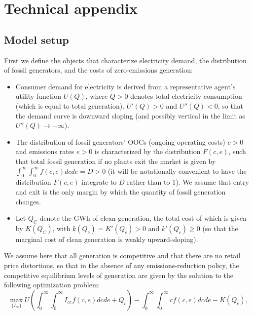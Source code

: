 \documentclass[12pt]{article}
\begin{document}
\newpage

%
%
%
%





\singlespace
\newpage


\appendix
\setcounter{page}{1}
\renewcommand{\thepage}{A-\arabic{page}}

\section*{Technical appendix}

\subsection*{Model setup}
First we define the objects that characterize electricity demand, the distribution of fossil generators, and the costs of zero-emissions generation:
\begin{itemize}
\item Consumer demand for electricity is derived from a representative agent's utility function $U(Q)$, where $Q>0$ denotes total electricity consumption (which is equal to total generation). $U'(Q)>0$ and $U''(Q)<0$, so that the demand curve is downward sloping (and possibly vertical in the limit as $U''(Q)\to -\infty$).
\item The distribution of fossil generators' OOCs (ongoing operating costs) $c>0$ and emissions rates $e>0$ is characterized by the distribution $F(c,e)$, such that total fossil generation if no plants exit the market is given by $\int_0^\infty\int_0^\infty f(c,e)dcde = D>0$ (it will be notationally convenient to have the distribution $F(c,e)$ integrate to $D$ rather than to 1). We assume that entry and exit is the only margin by which the quantity of fossil generation changes.
\item Let $Q_C$ denote the GWh of clean generation, the total cost of which is given by $K(Q_C)$, with $k(Q_c)=K'(Q_c)>0$ and $k'(Q_c)\geq0$ (so that the marginal cost of clean generation is weakly upward-sloping).
\end{itemize}

We assume here that all generation is competitive and that there are no retail price distortions, so that in the absence of any emissions-reduction policy, the competitive equilibrium levels of generation are given by the solution to the following optimization problem:
\begin{equation}
    \max_{\{I_{ce}\}} U\left(\int_0^\infty\int_0^\infty I_{ce}f(c,e)dcde + Q_c\right) - \int_0^\infty\int_0^\infty cf(c,e)dcde - K(Q_c), \label{appx:eq:CEmax}
\end{equation}
\end{document}
